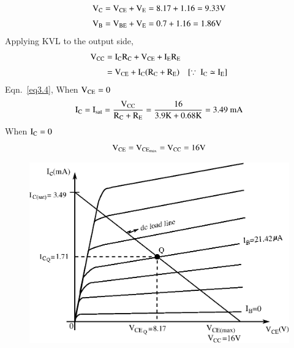 \begin{solution}
\begin{align*}
\textrm{V}_{\textrm{C}} &= \textrm{V}_{\text{CE}}+\textrm{V}_{\textrm{E}}=8.17+1.16=9.33\textrm{V}\\[3pt]
\textrm{V}_{\textrm{B}} &= \textrm{V}_{\text{BE}}+\textrm{V}_{\textrm{E}}=0.7+1.16=1.86\textrm{V}
\end{align*}
Applying KVL to the output side,
\begin{align}
\textrm{V}_{\text{CC}} &= \textrm{I}_{\textrm{C}}\textrm{R}_{\textrm{C}}+\textrm{V}_{\text{CE}}+\textrm{I}_{\textrm{E}}\textrm{R}_{\textrm{E}}\notag\\[3pt]
&= \textrm{V}_{\text{CE}}+\textrm{I}_{\textrm{C}}(\textrm{R}_{\textrm{C}}+\textrm{R}_{\textrm{E}})\quad [\because \ \textrm{I}_{\textrm{C}}\simeq \textrm{I}_{\textrm{E}}]\label{eq3.4}
\end{align}
Eqn.~\eqref{eq3.4}, When $\textrm{V}_{\text{CE}}=0$
$$
\textrm{I}_{\textrm{C}}=\textrm{I}_{\text{sat}}=\frac{\textrm{V}_{\text{CC}}}{\textrm{R}_{\textrm{C}}+\textrm{R}_{\textrm{E}}}=\frac{16}{3.9\textrm{K}+0.68\textrm{K}}=3.49\text{~mA}
$$
When $\textrm{I}_{\textrm{C}}=0$
$$
\textrm{V}_{\text{CE}}=\textrm{V}_{\text{CE}_{\max}}=\textrm{V}_{\text{CC}}=16\textrm{V}
$$
\begin{figure}[H]
\centering
\includegraphics[scale=.9]{chap3/fig3.25.eps}
\end{figure}
\end{solution}

\eject

